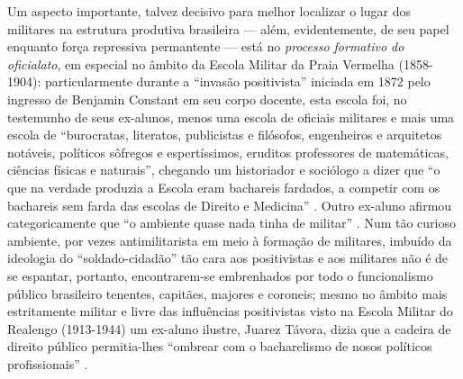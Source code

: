 Um aspecto importante, talvez decisivo para melhor localizar o lugar dos militares na estrutura produtiva brasileira --- além, evidentemente, de seu papel enquanto força repressiva permantente --- está no \textit{processo formativo do oficialato}, em especial no âmbito da Escola Militar da Praia Vermelha (1858-1904): particularmente durante a ``invasão positivista'' iniciada em 1872 pelo ingresso de Benjamin Constant em seu corpo docente, esta escola foi, no testemunho de seus ex-alunos, menos uma escola de oficiais militares e mais uma escola de ``burocratas, literatos, publicistas e filósofos, engenheiros e arquitetos notáveis, políticos sôfregos e espertíssimos, eruditos professores de matemáticas, ciências físicas e naturais'', chegando um historiador e sociólogo a dizer que ``o que na verdade produzia a Escola eram bachareis fardados, a competir com os bachareis sem farda das escolas de Direito e Medicina'' \cite[p.~196]{carvalho_militares_1977}. Outro ex-aluno afirmou categoricamente que ``o ambiente quase nada tinha de militar'' \cite[p.~196]{carvalho_militares_1977}. Num tão curioso ambiente, por vezes antimilitarista em meio à formação de militares, imbuído da ideologia do ``soldado-cidadão'' tão cara aos positivistas e aos militares  não é de se espantar, portanto, encontrarem-se embrenhados por todo o funcionalismo público brasileiro tenentes, capitães, majores e coroneis; mesmo no âmbito mais estritamente militar e livre das influências positivistas visto na Escola Militar do Realengo (1913-1944) um ex-aluno ilustre, Juarez Távora, dizia que a cadeira de direito público permitia-lhes ``ombrear com o bacharelismo de nosos políticos profissionais'' \cite[p.~211]{carvalho_militares_1977}.

